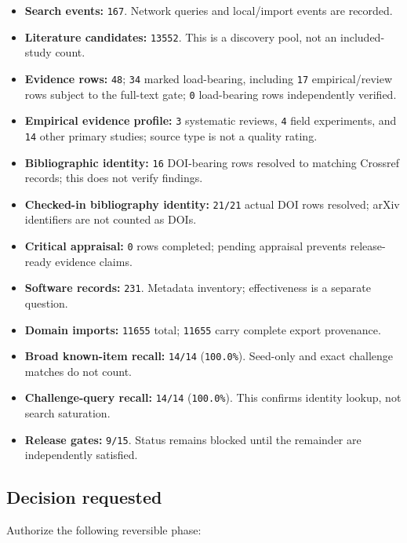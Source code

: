 \documentclass[11pt]{article}
\providecommand{\tightlist}{\setlength{\itemsep}{0pt}\setlength{\parskip}{0pt}}
\begin{document}
\begin{itemize}
\tightlist
\item
  \textbf{Search events:} \texttt{167}. Network queries and local/import events are recorded.
\item
  \textbf{Literature candidates:} \texttt{13552}. This is a discovery pool, not an included-study count.
\item
  \textbf{Evidence rows:} \texttt{48}; \texttt{34} marked load-bearing, including \texttt{17} empirical/review rows subject to the full-text gate; \texttt{0} load-bearing rows independently verified.
\item
  \textbf{Empirical evidence profile:} \texttt{3} systematic reviews, \texttt{4} field experiments, and \texttt{14} other primary studies; source type is not a quality rating.
\item
  \textbf{Bibliographic identity:} \texttt{16} DOI-bearing rows resolved to matching Crossref records; this does not verify findings.
\item
  \textbf{Checked-in bibliography identity:} \texttt{21/21} actual DOI rows resolved; arXiv identifiers are not counted as DOIs.
\item
  \textbf{Critical appraisal:} \texttt{0} rows completed; pending appraisal prevents release-ready evidence claims.
\item
  \textbf{Software records:} \texttt{231}. Metadata inventory; effectiveness is a separate question.
\item
  \textbf{Domain imports:} \texttt{11655} total; \texttt{11655} carry complete export provenance.
\item
  \textbf{Broad known-item recall:} \texttt{14/14} (\texttt{100.0\%}). Seed-only and exact challenge matches do not count.
\item
  \textbf{Challenge-query recall:} \texttt{14/14} (\texttt{100.0\%}). This confirms identity lookup, not search saturation.
\item
  \textbf{Release gates:} \texttt{9/15}. Status remains blocked until the remainder are independently satisfied.
\end{itemize}

\hypertarget{decision-requested}{%
\subsection{Decision requested}\label{decision-requested}}

Authorize the following reversible phase:
\end{document}
